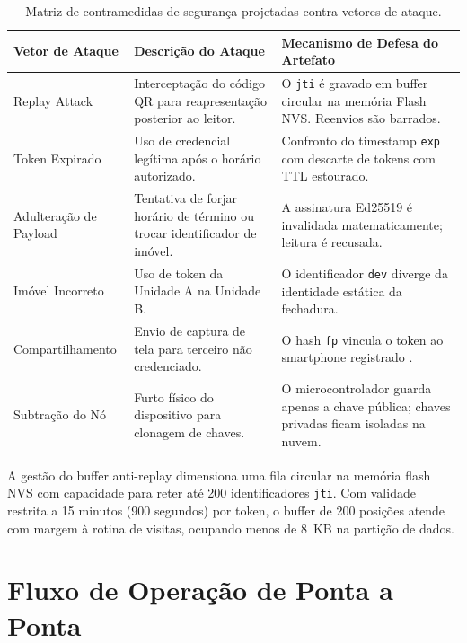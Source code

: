 \begin{table}[htbp]
\centering
\footnotesize
\caption{Matriz de contramedidas de segurança projetadas contra vetores de ataque.}
\label{quadro:vetores-ataque}
\begin{tabularx}{\textwidth}{p{3cm} X p{5.2cm}}
\toprule
\textbf{Vetor de Ataque} & \textbf{Descrição do Ataque} & \textbf{Mecanismo de Defesa do Artefato} \\
\midrule
Replay Attack & Interceptação do código QR para reapresentação posterior ao leitor. & O \texttt{jti} é gravado em buffer circular na memória Flash NVS. Reenvios são barrados. \\
Token Expirado & Uso de credencial legítima após o horário autorizado. & Confronto do timestamp \texttt{exp} com descarte de tokens com TTL estourado. \\
Adulteração de Payload & Tentativa de forjar horário de término ou trocar identificador de imóvel. & A assinatura Ed25519 é invalidada matematicamente; leitura é recusada. \\
Imóvel Incorreto & Uso de token da Unidade A na Unidade B. & O identificador \texttt{dev} diverge da identidade estática da fechadura. \\
Compartilhamento & Envio de captura de tela para terceiro não credenciado. & O hash \texttt{fp} vincula o token ao smartphone registrado \cite{satanasaowapak2021}. \\
Subtração do Nó & Furto físico do dispositivo para clonagem de chaves. & O microcontrolador guarda apenas a chave pública; chaves privadas ficam isoladas na nuvem. \\
\bottomrule
\end{tabularx}
\end{table}

A gestão do buffer anti-replay dimensiona uma fila circular na memória flash NVS com capacidade para reter até 200 identificadores \texttt{jti}. Com validade restrita a 15 minutos (900 segundos) por token, o buffer de 200 posições atende com margem à rotina de visitas, ocupando menos de 8~KB na partição de dados.

\section{Fluxo de Operação de Ponta a Ponta}
\label{sec:fluxo-ponta-a-ponta}

